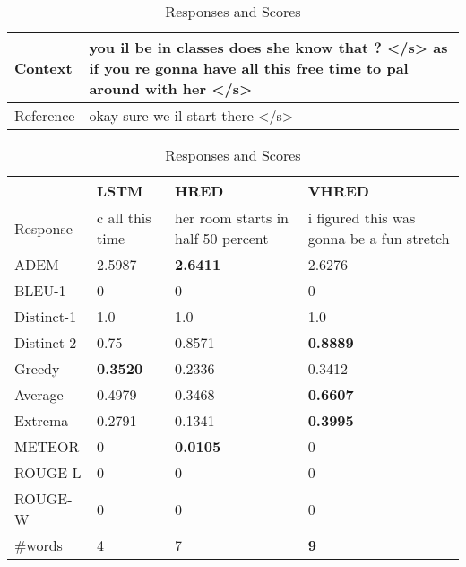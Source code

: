 \begin{table}[htb]
    \caption{An Example from OpenSubtitles}
    \label{tab:Example_OpenSubtitles}
    \centering
    \begin{subtable}{\textwidth}
        \centering
        \caption{Context and Reference}
        \begin{tabular}{|l|p{}|}
            \hline
            Context & you il be in classes does she know that ? </s> as if you re gonna have all this free time to pal around with her </s> \\
            \hline
            Reference & okay sure we il start there </s> \\
            \hline
        \end{tabular}
    \end{subtable}
    \begin{subtable}{\textwidth}
        \centering
        \caption{Responses and Scores}
        \begin{tabular}{|l|*{3}{p{}|}}
            \hline
            & LSTM & HRED & VHRED \\
            \hline
            Response & c all this time & her room starts in half 50 percent & i figured this was gonna be a fun stretch \\
            \hline
            ADEM & 2.5987 & \textbf{2.6411} & 2.6276 \\
            \hline
            BLEU-1 & 0 & 0 & 0 \\
            \hline
            Distinct-1 & 1.0 & 1.0 & 1.0 \\
            \hline
            Distinct-2 & 0.75 & 0.8571 & \textbf{0.8889} \\
            \hline
            Greedy & \textbf{0.3520} & 0.2336 & 0.3412 \\
            \hline
            Average & 0.4979 & 0.3468 & \textbf{0.6607} \\
            \hline
            Extrema & 0.2791 & 0.1341 & \textbf{0.3995} \\
            \hline
            METEOR & 0 & \textbf{0.0105} & 0 \\
            \hline
            ROUGE-L & 0 & 0 & 0 \\
            \hline
            ROUGE-W & 0 & 0 & 0 \\
            \hline
            \#words & 4 & 7 & \textbf{9} \\
            \hline
        \end{tabular}
    \end{subtable}
\end{table}

